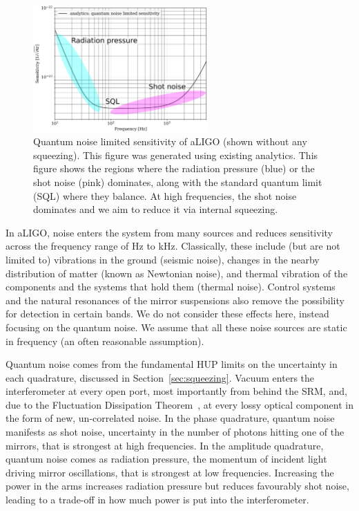 \documentclass[aps,pra,superscriptaddress,reprint,nofootinbib]{revtex4-1}
\begin{document}
\begin{figure}[ht]%
	\begin{center}
	\includegraphics[width=0.6\textwidth]{figures/sqz_aLIGO_analytics_quantum_noise_budget-labelled.pdf}
	\end{center}
	\caption{Quantum noise limited sensitivity of aLIGO (shown without any squeezing). This figure was generated using existing analytics. This figure shows the regions where the radiation pressure (blue) or the shot noise (pink) dominates, along with the standard quantum limit (SQL) where they balance. At high frequencies, the shot noise dominates and we aim to reduce it via internal squeezing.}
	\label{fig:sqz_aLIGO_analytics_quantum_noise_budget}
\end{figure}


In aLIGO, noise enters the system from many sources and reduces sensitivity across the frequency range of Hz to kHz. Classically, these include (but are not limited to) vibrations in the ground (seismic noise), changes in the nearby distribution of matter (known as Newtonian noise), and thermal vibration of the components and the systems that hold them (thermal noise). Control systems and the natural resonances of the mirror suspensions also remove the possibility for detection in certain bands. We do not consider these effects here, instead focusing on the quantum noise. We assume that all these noise sources are static in frequency (an often reasonable assumption). 


Quantum noise comes from the fundamental HUP limits on the uncertainty in each quadrature, discussed in Section~\ref{sec:squeezing}. Vacuum enters the interferometer at every open port, most importantly from behind the SRM, and, due to the Fluctuation Dissipation Theorem~\cite{Danilishin_2012}, at every lossy optical component in the form of new, un-correlated noise. In the phase quadrature, quantum noise manifests as shot noise, uncertainty in the number of photons hitting one of the mirrors, that is strongest at high frequencies. In the amplitude quadrature, quantum noise comes as radiation pressure, the momentum of incident light driving mirror oscillations, that is strongest at low frequencies. Increasing the power in the arms increases radiation pressure but reduces favourably shot noise, leading to a trade-off in how much power is put into the interferometer.
\end{document}
